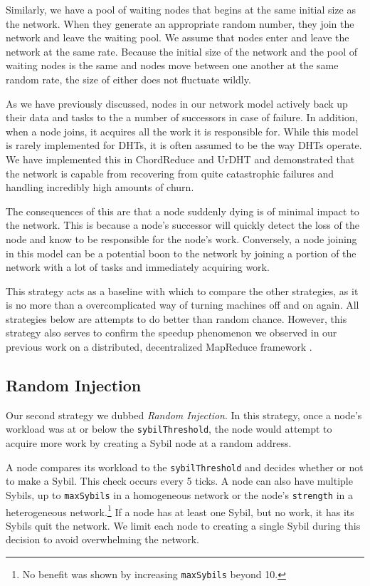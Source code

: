 \documentclass[11pt,conference]{IEEEtran}
\begin{document}
Similarly, we have a pool of waiting nodes that begins at the same initial size as the network.
When they generate an appropriate random number, they join the network and leave the waiting pool.
We assume that nodes enter and leave the network at the same rate.
Because the initial size of the network and the pool of waiting nodes is the same and nodes move between one another at the same random rate, the size of either does not fluctuate wildly.

As we have previously discussed, nodes in our network model actively back up their data and tasks to the a number of successors in case of failure.
In addition, when a node joins, it acquires all the work it is responsible for.
While this model is rarely implemented for DHTs, it is often assumed to be the way DHTs operate. 
We have implemented this in ChordReduce\cite{chordreduce} and UrDHT\cite{urdht} and demonstrated that the network is capable from recovering from quite catastrophic failures and handling incredibly high amounts of churn.

The consequences of this are that a node suddenly dying is of minimal impact to the network.
This is because a node's successor will quickly detect the loss of the node and know to be responsible for the node's work.
Conversely, a node joining in this model can be a potential boon to the network by joining a portion of the network with a lot of tasks and immediately acquiring work.

This strategy acts as a baseline with which to compare the other strategies, as it is no more than a overcomplicated way of turning machines off and on again. 
All strategies below are attempts to do better than random chance.
However, this strategy also serves to confirm the speedup phenomenon we observed in our previous work on a distributed, decentralized MapReduce framework \cite{chordreduce}.

\subsection{Random Injection}
\label{sec:strat-randomInject}
Our second strategy we dubbed \textit{Random Injection}.
In this strategy, once a node's workload was at or below the \texttt{sybilThreshold}, the node would attempt to acquire more work by creating a Sybil node at a random address.

A node compares its workload to the \texttt{sybilThreshold} and decides whether or not to make a Sybil.
This check occurs every 5 ticks.
A node can also have multiple Sybils, up to \texttt{maxSybils} in a homogeneous network or the node's \texttt{strength} in a heterogeneous network.\footnote{No benefit was shown by increasing \texttt{maxSybils} beyond 10.}
If a node has at least one Sybil, but no work, it has its Sybils quit the network.
We limit each node to creating a single Sybil during this decision to avoid overwhelming the network.
\end{document}
